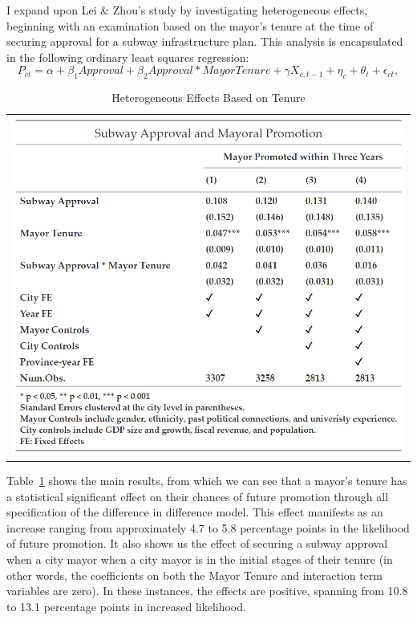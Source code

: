 \documentclass[12pt, ]{article}
\begin{document}
I expand upon Lei \& Zhou's study by investigating heterogeneous
effects, beginning with an examination based on the mayor's tenure at
the time of securing approval for a subway infrastructure plan. This
analysis is encapsulated in the following ordinary least squares
regression:
\[P_{ct} = \alpha + \beta_{1}Approval + \beta_{2}Approval * Mayor Tenure + \gamma X_{c,t - 1} + \eta_{c} + \theta_{t} + \epsilon_{ct},\]

\hypertarget{tbl-extension2}{}
\begin{longtable}[]{@{}l@{}}
\caption{\label{tbl-extension2}Heterogeneous Effects Based on
Tenure}\tabularnewline
\toprule\noalign{}
\endfirsthead
\endhead
\bottomrule\noalign{}
\endlastfoot
\includegraphics{tables/extension_tenure.png} \\
\end{longtable}

Table~\ref{tbl-extension2} shows the main results, from which we can see
that a mayor's tenure has a statistical significant effect on their
chances of future promotion through all specification of the difference
in difference model. This effect manifests as an increase ranging from
approximately 4.7 to 5.8 percentage points in the likelihood of future
promotion. It also shows us the effect of securing a subway approval
when a city mayor when a city mayor is in the initial stages of their
tenure (in other words, the coefficients on both the Mayor Tenure and
interaction term variables are zero). In these instances, the effects
are positive, spanning from 10.8 to 13.1 percentage points in increased
likelihood.
\end{document}
